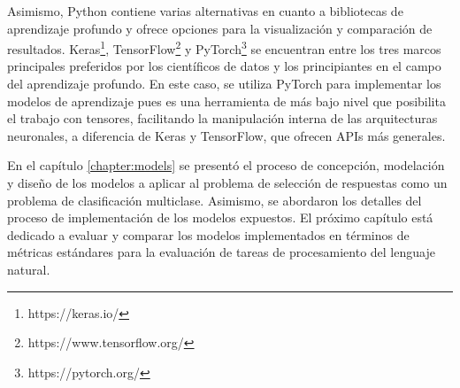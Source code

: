Asimismo, Python contiene varias alternativas en cuanto a bibliotecas de aprendizaje profundo y ofrece opciones para la visualización y comparación de resultados. Keras\footnote{https://keras.io/}, TensorFlow\footnote{https://www.tensorflow.org/} y PyTorch\footnote{https://pytorch.org/} se encuentran entre los tres marcos principales preferidos por los científicos de datos y los principiantes en el campo del aprendizaje profundo. En este caso, se utiliza PyTorch para implementar los modelos de aprendizaje pues es una herramienta de más bajo nivel que posibilita el trabajo con tensores, facilitando la manipulación interna de las arquitecturas neuronales, a diferencia de Keras y TensorFlow, que ofrecen APIs más generales.

En el capítulo \ref{chapter:models} se presentó el proceso de concepción, modelación y diseño de los modelos a aplicar al problema de selección de respuestas como un problema de clasificación multiclase. Asimismo, se abordaron los detalles del proceso de implementación de los modelos expuestos. El próximo capítulo está dedicado a evaluar y comparar los modelos implementados en términos de métricas estándares para la evaluación de tareas de procesamiento del lenguaje natural.





